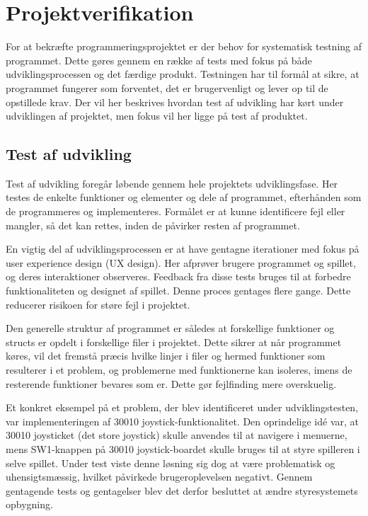 \chapter{Projektverifikation}
For at bekræfte programmeringsprojektet er der behov for systematisk testning af programmet. Dette gøres gennem en række af tests med fokus på både udviklingsprocessen og det færdige produkt. 
Testningen har til formål at sikre, at programmet fungerer som forventet, det er brugervenligt og lever op til de opstillede krav.
Der vil her beskrives hvordan test af udvikling har kørt under udviklingen af projektet, men fokus vil her ligge på test af produktet. 

\section{Test af udvikling}
\vspace{0.5em}
Test af udvikling foregår løbende gennem hele projektets udviklingsfase. Her testes de enkelte funktioner og elementer og dele af programmet, efterhånden som de programmeres og implementeres. Formålet er at kunne identificere fejl eller mangler, så det kan rettes, inden de påvirker resten af programmet.

En vigtig del af udviklingsprocessen er at have gentagne iterationer med fokus på user experience design (UX design). Her afprøver brugere programmet og spillet, og deres interaktioner observeres. Feedback fra disse tests bruges til at forbedre funktionaliteten og designet af spillet. Denne proces gentages flere gange. Dette reducerer risikoen for støre fejl i projektet.

Den generelle struktur af programmet er således at forskellige funktioner og structs er opdelt i forskellige filer i projektet. Dette sikrer at når programmet køres, vil det fremstå præcis hvilke linjer i filer og hermed funktioner som resulterer i et problem, og problemerne med funktionerne kan isoleres, imens de resterende funktioner bevares som er. Dette gør fejlfinding mere overskuelig.

Et konkret eksempel på et problem, der blev identificeret under udviklingstesten, var implementeringen af 30010 joystick-funktionalitet. Den oprindelige idé var, at 30010 joysticket (det store joystick) skulle anvendes til at navigere i menuerne, mens SW1-knappen på 30010 joystick-boardet skulle bruges til at styre spilleren i selve spillet. Under test viste denne løsning sig dog at være problematisk og uhensigtsmæssig, hvilket påvirkede brugeroplevelsen negativt. Gennem gentagende tests og gentagelser blev det derfor besluttet at ændre styresystemets opbygning.

